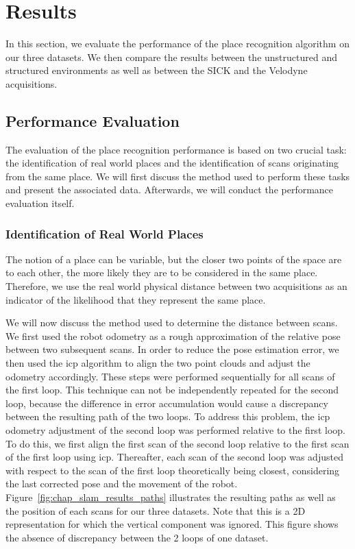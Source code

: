 \section{Results}
\label{sec:chap_slam_results}

In this section, we evaluate the performance of the place recognition algorithm on our three datasets. We then compare the results between the unstructured and structured environments as well as between the SICK and the Velodyne acquisitions. 

\subsection{Performance Evaluation}
\label{ssec:chap_slam_performance_evaluation}

The evaluation of the place recognition performance is based on two crucial task: the identification of real world places and the identification of scans originating from the same place. We will first discuss the method used to perform these tasks and present the associated data. Afterwards, we will conduct the performance evaluation itself.

\subsubsection{Identification of Real World Places}
The notion of a place can be variable, but the closer two points of the space are to each other, the more likely they are to be considered in the same place. Therefore, we use the real world physical distance between two acquisitions as an indicator of the likelihood that they represent the same place. 

We will now discuss the method used to determine the distance between scans. We first used the robot odometry as a rough approximation of the relative pose between two subsequent scans. In order to reduce the pose estimation error, we then used the \gls*{icp} algorithm to align the two point clouds and adjust the odometry accordingly. These steps were performed sequentially for all scans of the first loop. This technique can not be independently repeated for the second loop, because the difference in error accumulation would cause a discrepancy between the resulting path of the two loops. To address this problem, the \gls*{icp} odometry adjustment of the second loop was performed relative to the first loop. To do this, we first align the first scan of the second loop relative to the first scan of the first loop using \gls*{icp}. Thereafter, each scan of the second loop was adjusted with respect to the scan of the first loop theoretically being closest, considering the last corrected pose and the movement of the robot. Figure~\ref{fig:chap_slam_results_paths} illustrates the resulting paths as well as the position of each scans for our three datasets. Note that this is a 2D representation for which the vertical component was ignored. This figure shows the absence of discrepancy between the 2 loops of one dataset.

